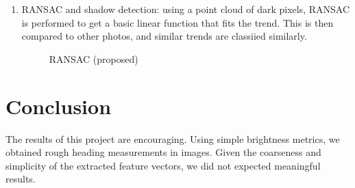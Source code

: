 \documentclass{article}
\begin{document}
\begin{enumerate}[1.]
\item RANSAC and shadow detection: using a point cloud of dark pixels, RANSAC is performed to get a basic linear function that fits the trend. This is then compared to other photos, and similar trends are classiied similarly.
\begin{figure}[H]
\centering
\setlength\fboxsep{2pt}
\setlength\fboxrule{0pt}
\caption{
RANSAC (proposed)
}
\end{figure}

\end{enumerate}

\section{Conclusion}

The results of this project are encouraging. Using simple brightness metrics, we obtained rough heading measurements in images. Given the coarseness and simplicity of the extracted feature vectors, we did not expected meaningful results.





\end{document}
